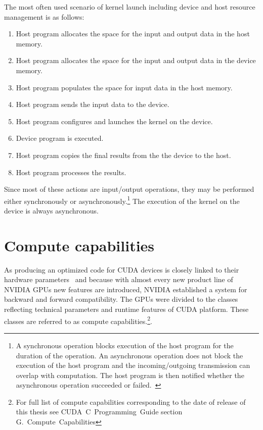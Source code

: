 \documentclass[12pt,twoside]{fithesis2}
\begin{document}
The most often used scenario of kernel launch including device and host resource management is as follows:
\begin{enumerate}[noitemsep]
	\item Host program allocates the space for the input and output data in the host memory.
	\item Host program allocates the space for the input and output data in the device memory.
	\item Host program populates the space for input data in the host memory.
	\item Host program sends the input data to the device.
	\item Host program configures and launches the kernel on the device.
	\item Device program is executed.
	\item Host program copies the final results from the the device to the host.
	\item Host program processes the results. 
\end{enumerate}

\noindent
Since most of these actions are input/output operations, they may be performed either synchronously or asynchronously.\footnote{A synchronous operation blocks execution of the host program for the duration of the operation. An asynchronous operation does not block the execution of the host program and the incoming/outgoing transmission can overlap with computation. The host program is then notified whether the asynchronous operation succeeded or failed.~\cite{async_io}} The execution of the kernel on the device is always asynchronous.~\cite{cuda_guide}

\section{Compute capabilities}

As producing an optimized code for CUDA devices is closely linked to their hardware parameters~\cite{cuda_best_practices} and because with almost every new product line of NVIDIA GPUs new features are introduced, NVIDIA established a system for backward and forward compatibility. The GPUs were divided to the classes reflecting technical parameters and runtime features of CUDA platform. These classes are referred to as compute capabilities.\footnote{For full list of compute capabilities corresponding to the date of release of this thesis see CUDA~C~Programming~Guide \cite{cuda_guide} section G.~Compute~Capabilities}.
\end{document}
